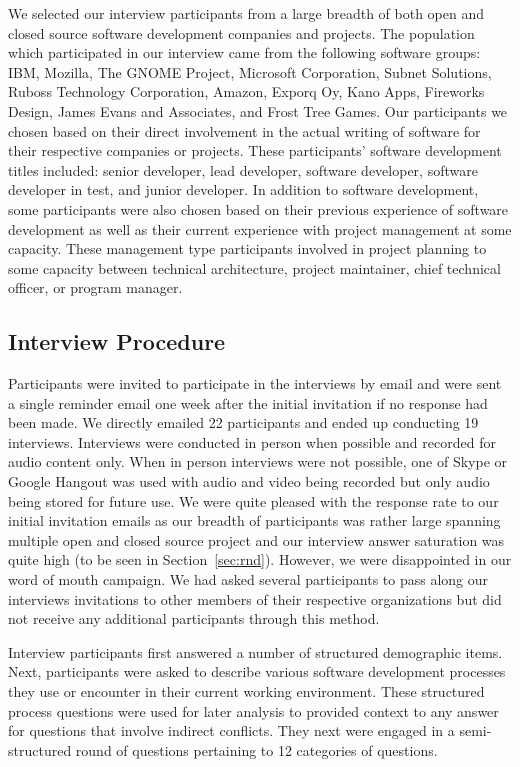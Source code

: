 \documentclass[conference]{IEEEtran}
\begin{document}
We selected our interview participants from a large breadth of both open and closed source software development companies
and projects. The population which participated in our interview came from the following software groups: 
IBM, Mozilla, The GNOME Project, Microsoft Corporation, Subnet Solutions, Ruboss Technology Corporation, 
Amazon, Exporq Oy, Kano Apps, Fireworks Design, James Evans and Associates, and Frost Tree Games. 
Our participants we chosen based on their direct involvement in the actual writing of software for
their respective companies or projects. These participants' software development titles included: senior developer,
lead developer, software developer, software developer in test, and junior developer.
In addition to software development, some participants were also chosen based on their previous experience
of software development as well as their current experience with project management at some capacity. These management
type participants involved in project planning to some capacity between technical architecture, project maintainer,  
chief technical officer, or program manager.

\subsection{Interview Procedure}

Participants were invited to participate in the interviews by email and were sent a single reminder email one week
after the initial invitation if no response had been made. We directly emailed 22 participants and ended up conducting
19 interviews. Interviews were conducted in person when possible and recorded for audio content only. When in person
interviews were not possible, one of Skype or Google Hangout was used with audio and video being recorded but only
audio being stored for future use. We were quite pleased with the response rate to our initial invitation emails as
our breadth of participants was rather large spanning multiple open and closed source project and our interview 
answer saturation was quite high (to be seen in Section~\ref{sec:rnd}). However, we were disappointed in our word
of mouth campaign. We had asked several participants to pass along our interviews invitations to other members of
their respective organizations but did not receive any additional participants through this method.

Interview participants first answered a number of structured demographic items. Next, participants were 
asked to describe various software development processes they use or encounter in their current working
environment. These structured process questions were used for later analysis to provided context to
any answer for questions that involve indirect conflicts. They next were engaged in a
semi-structured round of questions pertaining to 12 categories of questions. 
\end{document}
